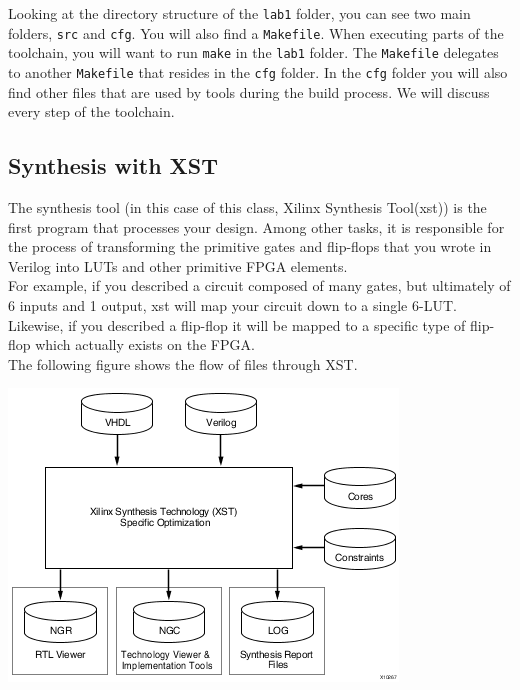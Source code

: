 \documentclass[11pt]{article}
\begin{document}
Looking at the directory structure of the \verb|lab1| folder, you can see two main folders, \verb|src| and \verb|cfg|. You will also find a \verb|Makefile|. When executing parts of the toolchain, you will want to run \verb|make| in the \verb|lab1| folder. The \verb|Makefile| delegates to another \verb|Makefile| that resides in the \verb|cfg| folder. In the \verb|cfg| folder you will also find other files that are used by tools during the build process. We will discuss every step of the toolchain.\\

\subsection{Synthesis with XST}
The synthesis tool (in this case of this class, Xilinx Synthesis Tool(xst)) is the first program that processes your design. Among other tasks, it is responsible for the process of transforming the primitive gates and flip-flops that you wrote in Verilog into LUTs and other primitive FPGA elements.\\

For example, if you described a circuit composed of many gates, but ultimately of 6 inputs and 1 output, xst will map your circuit down to a single 6-LUT. Likewise, if you described a flip-flop it will be mapped to a specific type of flip-flop which actually exists on the FPGA.\\

The following figure shows the flow of files through XST. \\

\begin{center}
	\includegraphics{images/xst_design_flow.png}
\end{center}
\end{document}
